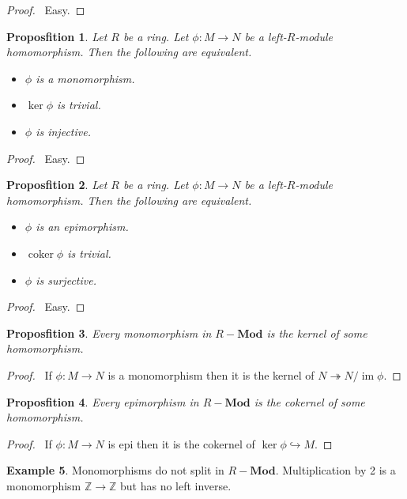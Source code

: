 \documentclass{book}
\let\qed\relax
\newtheorem{prop}{Proposfition}[chapter]
\theoremstyle{definition}
\newtheorem{ex}[prop]{Example}
\newcommand{\coker}{\ensuremath{\operatorname{coker}}}
\newcommand{\im}{\ensuremath{\operatorname{im}}}
\newcommand{\Mod}[1]{\ensuremath{{#1}-\mathbf{Mod}}}
\begin{document}
\begin{proof}
\pf\ Easy. \qed
\end{proof}

\begin{prop}
Let $R$ be a ring. Let $\phi : M \rightarrow N$ be a left-$R$-module homomorphism. Then the following are equivalent.
\begin{itemize}
\item $\phi$ is a monomorphism.
\item $\ker \phi$ is trivial.
\item $\phi$ is injective.
\end{itemize}
\end{prop}

\begin{proof}
\pf\ Easy. \qed
\end{proof}

\begin{prop}
Let $R$ be a ring. Let $\phi : M \rightarrow N$ be a left-$R$-module homomorphism. Then the following are equivalent.
\begin{itemize}
\item $\phi$ is an epimorphism.
\item $\coker \phi$ is trivial.
\item $\phi$ is surjective.
\end{itemize}
\end{prop}

\begin{proof}
\pf\ Easy. \qed
\end{proof}

\begin{prop}
Every monomorphism in $\Mod{R}$ is the kernel of some homomorphism.
\end{prop}

\begin{proof}
\pf\ If $\phi : M \rightarrow N$ is a monomorphism then it is the kernel of $N \twoheadrightarrow N / \im \phi$. \qed
\end{proof}

\begin{prop}
Every epimorphism in $\Mod{R}$ is the cokernel of some homomorphism.
\end{prop}

\begin{proof}
\pf\ If $\phi : M \rightarrow N$ is epi then it is the cokernel of $\ker \phi \hookrightarrow M$. \qed
\end{proof}

\begin{ex}
Monomorphisms do not split in $\Mod{R}$. Multiplication by 2 is a monomorphism $\mathbb{Z} \rightarrow \mathbb{Z}$ but has no left inverse.
\end{ex}
\end{document}
